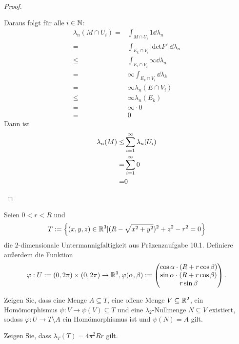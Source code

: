 \begin{proof}
\begin{parts}
	Daraus folgt f\"{u}r alle $i\in \mathbb{N}$:
	\begin{align*}
		\lambda_n(M\cap U_i)=&\int_{M\cap U_i}1\dd{\lambda_n}\\
		=&\int_{E_k\cap V_i}|\text{det}F'|\dd{\lambda_n}\\
		\le&\int_{E_l\cap V_i}\infty\dd{\lambda_n}\\
		=&\infty \int_{E_k\cap V_i}\dd{\lambda_k}\\
		=&\infty\lambda_n(E\cap V_i)\\
		\le&\infty\lambda_n(E_k)\\
		=&\infty\cdot 0\\
		=&0
	\end{align*}
	Dann ist
\begin{align*}
	\lambda_n(M)\le&\sum_{i=1}^\infty \lambda_n(U_i)\\
	=&\sum_{i=1}^\infty 0\\
	=&0\qedhere
\end{align*}
	\end{parts}
\end{proof}
\begin{Problem}
	Seien $0<r<R$ und
	\[
	T:=\left\{ (x,y,z)\in \mathbb{R}^3|(R-\sqrt{x^2+y^2})^2+z^2-r^2=0 \right\} 
\]
die $2$-dimensionale Untermannigfaltigkeit aus Präzenzaufgabe 10.1. Definiere außerdem die Funktion
\[
\varphi:U:=(0,2\pi)\times (0,2\pi)\to \mathbb{R}^3,\varphi(\alpha,\beta):=\begin{pmatrix} \cos\alpha \cdot (R+r\cos\beta)\\ \sin\alpha \cdot (R+r\cos\beta) \\ r\sin\beta \end{pmatrix} 
.\] 
\begin{parts}
\item Zeigen Sie, dass eine Menge $A\subseteq T$, eine offene Menge $V\subseteq \mathbb{R}^2$, ein Homömorphismus $\psi:V\to \psi(V)\subseteq T$ und eine $\lambda_2$-Nullmenge $N\subseteq V$ existiert, sodass $\varphi:U\to T\setminus A$ ein Homömorphismus ist und $\psi(N)=A$ gilt.
\item Zeigen Sie, dass $\lambda_T(T)=4\pi^2 Rr$ gilt.
\end{parts}
\end{Problem}
